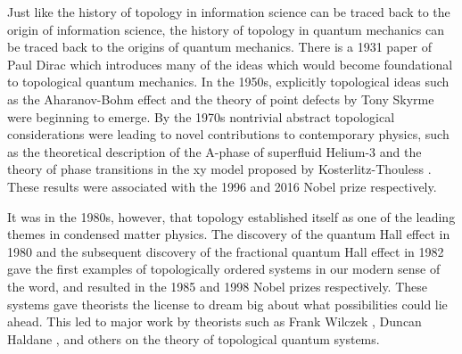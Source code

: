 \documentclass{article}
\theoremstyle{definition}
\newcommand{\0}{\left|0\right>}
\newcommand{\1}{\left|1\right>}
\numberwithin{figure}{section}
\begin{document}
Just like the history of topology in information science can be traced back to the origin of information science, the history of topology in quantum mechanics can be traced back to the origins of quantum mechanics. There is a 1931 paper of Paul Dirac \cite{dirac1931quantised} which introduces many of the ideas which would become foundational to topological quantum mechanics. In the 1950s, explicitly topological ideas such as the Aharanov-Bohm effect \cite{aharonov1959significance} and the theory of point defects by Tony Skyrme \cite{skyrme1962unified} were beginning to emerge. By the 1970s nontrivial abstract topological considerations were leading to novel contributions to contemporary physics, such as the theoretical description of the A-phase of superfluid Helium-3 \cite{anderson1977phase} and the theory of phase transitions in the xy model proposed by Kosterlitz-Thouless \cite{kosterlitz1973ordering}. These results were associated with the 1996 and 2016 Nobel prize respectively.

It was in the 1980s, however, that topology established itself as one of the leading themes in condensed matter physics. The discovery of the quantum Hall effect in 1980 \cite{klitzing1980new} and the subsequent discovery of the fractional quantum Hall effect in 1982 \cite{tsui1982two} gave the first examples of topologically ordered systems in our modern sense of the word, and resulted in the 1985 and 1998 Nobel prizes respectively. These systems gave theorists the license to dream big about what possibilities could lie ahead. This led to major work by theorists such as Frank Wilczek \cite{wilczek1982quantum, arovas1985statistical}, Duncan Haldane \cite{haldane1983nonlinear, haldane1988model}, and others on the theory of topological quantum systems.
\end{document}
